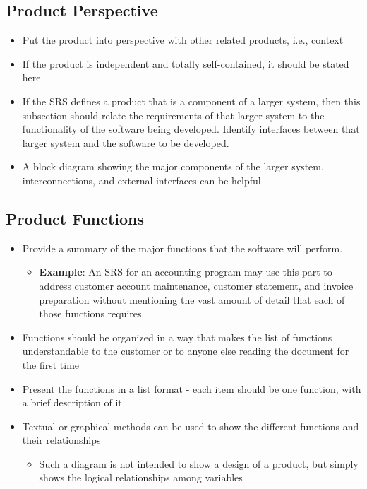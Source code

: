 \documentclass[]{article}
\begin{document}
\subsection{Product Perspective}
\label{sub:product_perspective}
\begin{itemize}
	\item Put the product into perspective with other related products, i.e., context
	\item If the product is independent and totally self-contained, it should be stated here
	\item If the SRS defines a product that is a component of a larger system, then this subsection should relate the requirements of that larger system to the functionality of the software being developed. Identify interfaces between that larger system and the software to be developed.
	\item A block diagram showing the major components of the larger system, interconnections, and external interfaces can be helpful
\end{itemize}

\subsection{Product Functions}
\label{sub:product_functions}
\begin{itemize}
	\item Provide a summary of the major functions that the software will perform.
	\begin{itemize}
		\item \textbf{Example}: An SRS for an accounting program may use this part to address customer account maintenance, customer statement, and invoice preparation without mentioning the vast amount of detail that each of those functions requires.
	\end{itemize}
	\item Functions should be organized in a way that makes the list of functions understandable to the customer or to anyone else reading the document for the first time 
	\item Present the functions in a list format - each item should be one function, with a brief description of it
	\item Textual or graphical methods can be used to show the different functions and their relationships
	\begin{itemize}
		\item Such a diagram is not intended to show a design of a product, but simply shows the logical relationships among variables
	\end{itemize} 
\end{itemize}
\end{document}
